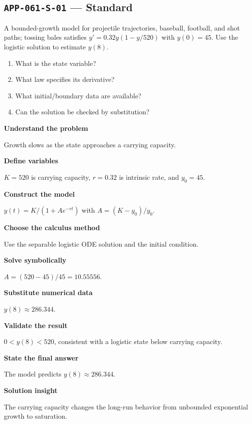 \documentclass[11pt]{book}
\newcommand{\pid}[1]{\texttt{#1}}
\begin{document}
\subsection*{\pid{APP-061-S-01} — Standard}
\begin{problembox}
A bounded-growth model for projectile trajectories, baseball, football, and shot paths; tossing bales satisfies $y'=0.32y(1-y/520)$ with $y(0)=45$. Use the logistic solution to estimate $y(8)$.
\end{problembox}
\begin{promptbox}\begin{enumerate}
\item What is the state variable?
\item What law specifies its derivative?
\item What initial/boundary data are available?
\item Can the solution be checked by substitution?
\end{enumerate}\end{promptbox}
\begin{solutionbox}
\textbf{Understand the problem}\par Growth slows as the state approaches a carrying capacity.\par\medskip
\textbf{Define variables}\par $K=520$ is carrying capacity, $r=0.32$ is intrinsic rate, and $y_0=45$.\par\medskip
\textbf{Construct the model}\par $y(t)=K/(1+A e^{-rt})$ with $A=(K-y_0)/y_0$.\par\medskip
\textbf{Choose the calculus method}\par Use the separable logistic ODE solution and the initial condition.\par\medskip
\textbf{Solve symbolically}\par $A=(520-45)/45=10.55556$.\par\medskip
\textbf{Substitute numerical data}\par $y(8)\approx 286.344$.\par\medskip
\textbf{Validate the result}\par $0<y(8)<520$, consistent with a logistic state below carrying capacity.\par\medskip
\textbf{State the final answer}\par The model predicts $y(8)\approx 286.344$.\par\medskip
\textbf{Solution insight}\par The carrying capacity changes the long-run behavior from unbounded exponential growth to saturation.\par\medskip
\end{solutionbox}
\end{document}
